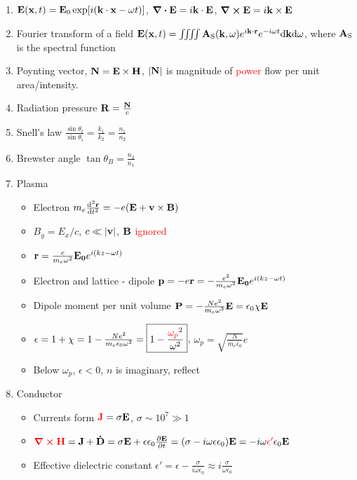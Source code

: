 \documentclass{article}
\theoremstyle{remark}
\theoremstyle{remark}
\newcommand{\s}[1]{\textsubscript{#1}}
\begin{document}
\begin{enumerate}
    \item $\vb{E}(\vb{x},t)=\vb{E}_0\exp[i(\vb{k}\cdot\vb{x}-\omega t)]$, $\div\vb{E}=i\vb{k}\cdot\vb{E}$, $\curl\vb{E}=i\vb{k}\times\vb{E}$
    \item Fourier transform of a field $\vb{E}(\vb{x},t)=\iiiint \vb{A}\s S(\vb{k},\omega)e^{i\vb{k}\cdot\vb{r}}e^{-i\omega t}\dd\vb{k}\dd\omega$, where $\vb{A}\s S$ is the spectral function
    \item Poynting vector, $\vb{N}=\vb{E}\times\vb{H}$, $|\vb{N}|$ is magnitude of \textcolor{red}{power} flow per unit area/intensity.
    \item Radiation pressure $\vb{R}=\frac{\vb{N}}{c}$
    \item Snell's law $\frac{\sin\theta_t}{\sin\theta_i}=\frac{k_1}{k_2}=\frac{n_1}{n_2}$
    \item Brewster angle $\tan\theta_B=\frac{n_2}{n_1}$
    \item Plasma\begin{itemize}
        \item Electron $m_e\dv[2]{\vb{r}}{t}=-e(\vb{E}+\vb{v}\times\vb{B})$
        \item $B_y=E_x/c$, $c\ll|\vb{v}|$, $\vb{B}$ \textcolor{red}{ignored}
        \item $\vb{r}=\frac{e}{m_e\omega^2}\vb{E_0}e^{i(kz-\omega t)}$
        \item Electron and lattice - dipole $\vb{p}=-e\vb{r}=-\frac{e^2}{m_e\omega^2}\vb{E_0}e^{i(kz-\omega t)}$
        \item Dipole moment per unit volume $\vb{P}=-\frac{Ne^2}{m_e\omega^2}\vb{E}=\epsilon_0\chi\vb{E}$
        \item $\epsilon=1+\chi=1-\frac{Ne^2}{m_e\epsilon_0\omega^2}=\boxed{1-\frac{\textcolor{red}{\omega_p}^2}{\omega^2}}$, $\omega_p=\sqrt{\frac{N}{m_e\epsilon_0}}e$
        \item Below $\omega_p$, $\epsilon<0$, $n$ is imaginary, reflect
    \end{itemize}
    \item Conductor\begin{itemize}
        \item Currents form $\textcolor{red}{\vb{J}}=\sigma\vb{E}$, $\sigma\sim10^7\gg1$
        \item $\textcolor{red}{\curl\vb{H}}=\vb{J}+\vb{\dot D}=\sigma\vb{E}+\epsilon\epsilon_0\pdv{\vb{E}}{t}=(\sigma-i\omega\epsilon\epsilon_0)\vb{E}=-i\omega\textcolor{red}{\epsilon'}\epsilon_0\vb{E}$
        \item Effective dielectric constant $\epsilon'=\epsilon-\frac{\sigma}{i\omega\epsilon_0}\approx \boxed{i\frac{\sigma}{\omega\epsilon_0}}$

\end{itemize}
\end{enumerate}
\end{document}
